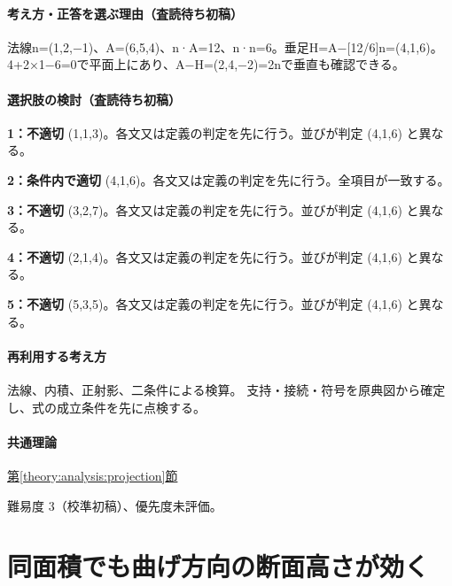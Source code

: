 \paragraph{考え方・正答を選ぶ理由（査読待ち初稿）} 法線n=\allowbreak{}(1,2,−1)、A=\allowbreak{}(6,5,4)、n·A=\allowbreak{}12、n·n=\allowbreak{}6。垂足H=\allowbreak{}A−[12/6]n=\allowbreak{}(4,1,6)。4+2×1−6=\allowbreak{}0で平面上にあり、A−H=\allowbreak{}(2,4,−2)=\allowbreak{}2nで垂直も確認できる。

\paragraph{選択肢の検討（査読待ち初稿）}\mbox{}\par

\noindent\textbf{1：不適切} (1,1,3)。各文又は定義の判定を先に行う。並びが判定 (4,1,6) と異なる。\par

\noindent\textbf{2：条件内で適切} (4,1,6)。各文又は定義の判定を先に行う。全項目が一致する。\par

\noindent\textbf{3：不適切} (3,2,7)。各文又は定義の判定を先に行う。並びが判定 (4,1,6) と異なる。\par

\noindent\textbf{4：不適切} (2,1,4)。各文又は定義の判定を先に行う。並びが判定 (4,1,6) と異なる。\par

\noindent\textbf{5：不適切} (5,3,5)。各文又は定義の判定を先に行う。並びが判定 (4,1,6) と異なる。\par

\paragraph{再利用する考え方} 法線、内積、正射影、二条件による検算。 支持・接続・符号を原典図から確定し、式の成立条件を先に点検する。

\paragraph{共通理論} \hyperref[theory:analysis:projection]{第\ref*{theory:analysis:projection}節}

\par 難易度 3（校準初稿）、優先度未評価。

\section{同面積でも曲げ方向の断面高さが効く}

